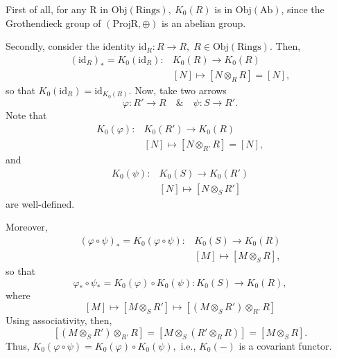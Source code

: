 \documentclass[../category_theory.tex]{subfiles}
\begin{document}
\begin{proof*}
	First of all, for any R in \(\mathrm{Obj}(\mathrm{Rings}),\: K_{0}(R)\) is in \(\mathrm{Obj}(\mathrm{Ab})\), since the Grothendieck group of \((\mathrm{Proj R}, \oplus)\) is an abelian group.

	Secondly, consider the identity \(\mathrm{id}_R:R\rightarrow R, \; R\in \mathrm{Obj}(\mathrm{Rings})\). Then,
	\begin{align*}
		(\mathrm{id}_{R})_{*}=K_{0}(\mathrm{id}_{R}): & K_{0}(R)\rightarrow K_{0}(R)      \\
		                                              & [N]\mapsto [N\otimes_{R}R] = [N],
	\end{align*}
	so that \(K_{0}(\mathrm{id}_{R}) = \mathrm{id}_{K_{0}(R)}\). Now, take two arrows
	\[
		\varphi :R'\rightarrow R\quad\&\quad \psi:S\rightarrow R'.
	\]
	Note that
	\begin{align*}
		K_{0}(\varphi ): & K_{0}(R')\rightarrow K_{0}(R)      \\
		                 & [N]\mapsto [N\otimes_{R'}R] = [N],
	\end{align*}
	and
	\begin{align*}
		K_{0}(\psi): & K_{0}(S)\rightarrow K_{0}(R') \\
		             & [N]\mapsto [N\otimes_{S}R']
	\end{align*}
	are well-defined.

	Moreover,
	\begin{align*}
		(\varphi\circ \psi)_{*}=K_{0}(\varphi \circ \psi): & K_{0}(S)\rightarrow K_{0}(R) \\
		                                                   & [M]\mapsto [M\otimes_{S}R],
	\end{align*}
	so that
	\[
		\varphi_{*}\circ \psi_{*} = K_{0}(\varphi )\circ K_{0}(\psi):K_{0}(S)\rightarrow K_{0}(R),
	\]
	where
	\[
		[M]\mapsto [M\otimes_{S}R']\mapsto [(M\otimes_{S}R')\otimes_{R'}R]
	\]
	Using associativity, then,
	\[
		[(M\otimes_{S}R')\otimes_{R'}R]=[M\otimes_{S}(R'\otimes_{R}R)] = [M\otimes_{S}R].
	\]
	Thus, \(K_{0}(\varphi \circ \psi) = K_{0}(\varphi )\circ K_{0}(\psi),\) i.e., \(K_{0}(-)\) is a covariant functor. \qedsymbol
\end{proof*}
\end{document}
